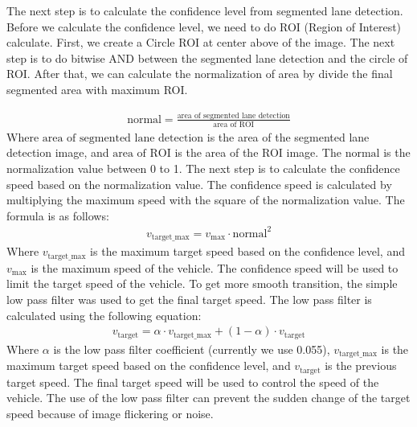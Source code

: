\documentclass[conference, a4paper]{IEEEtran}[2015/08/26]
\begin{document}
\par    
The next step is to calculate the confidence level from segmented lane detection. Before we calculate the confidence level, we need to do ROI (Region of Interest) calculate. First, we create a Circle ROI at center above of the image. The next step is to do bitwise AND between the segmented lane detection and the circle of ROI. After that, we can calculate the normalization of area by divide the final segmented area with maximum ROI. 

\begin{equation}
	\begin{aligned}
	\text{normal} = \frac{\text{area of segmented lane detection}}{\text{area of ROI}}
	\label{eq:confidence_level}
	\end{aligned}
\end{equation}
Where $\text{area of segmented lane detection}$ is the area of the segmented lane detection image, and $\text{area of ROI}$ is the area of the ROI image. The $\text{normal}$ is the normalization value between 0 to 1.
The next step is to calculate the confidence speed based on the normalization value. The confidence speed is calculated by multiplying the maximum speed with the square of the normalization value. The formula is as follows:
\begin{equation}
	\begin{aligned}
		v_{\text{target\_max}} = v_{\text{max}} \cdot \text{normal}^2
	\label{eq:confidence_speed}
	\end{aligned}
\end{equation}
Where $v_{\text{target\_max}}$ is the maximum target speed based on the confidence level, and $v_{\text{max}}$ is the maximum speed of the vehicle. The confidence speed will be used to limit the target speed of the vehicle. To get more smooth transition, the simple low pass filter was used to get the final target speed. The low pass filter is calculated using the following equation:
\begin{equation}
	\begin{aligned}
		v_{\text{target}} = \alpha \cdot v_{\text{target\_max}} + (1 - \alpha) \cdot v_{\text{target}}
	\label{eq:low_pass_filter}
	\end{aligned}
\end{equation}
Where $\alpha$ is the low pass filter coefficient (currently we use 0.055), $v_{\text{target\_max}}$ is the maximum target speed based on the confidence level, and $v_{\text{target}}$ is the previous target speed. The final target speed will be used to control the speed of the vehicle. The use of the low pass filter can prevent the sudden change of the target speed because of image flickering or noise. 
\end{document}
